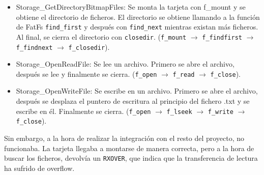 \begin{itemize}
    \item Storage\_GetDirectoryBitmapFiles: Se monta la tarjeta con f\_mount y se obtiene el directorio de ficheros. El directorio se obtiene llamando a la función de FatFs \texttt{find\_first} y después con \texttt{find\_next} mientras existan más ficheros. Al final, se cierra el directorio con \texttt{closedir}. (\texttt{f\_mount} $\rightarrow$ \texttt{f\_findfirst} $\rightarrow$ \texttt{f\_findnext} $\rightarrow$ \texttt{f\_closedir}).
    \item Storage\_OpenReadFile: Se lee un archivo. Primero se abre el archivo, después se lee y finalmente se cierra. (\texttt{f\_open} $\rightarrow$ \texttt{f\_read} $\rightarrow$ \texttt{f\_close}).
    \item Storage\_OpenWriteFile: Se escribe en un archivo. Primero se abre el archivo, después se desplaza el puntero de escritura al principio del fichero .txt y se escribe en él. Finalmente se cierra. (\texttt{f\_open} $\rightarrow$ \texttt{f\_lseek} $\rightarrow$ \texttt{f\_write} $\rightarrow$ \texttt{f\_close}).
\end{itemize}

Sin embargo, a la hora de realizar la integración con el resto del proyecto, no funcionaba. La tarjeta llegaba a montarse de manera correcta, pero a la hora de buscar los ficheros, devolvía un \texttt{RXOVER}, que indica que la transferencia de lectura ha sufrido de overflow. 



